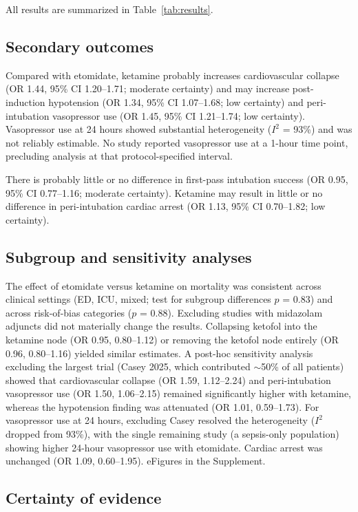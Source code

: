 \documentclass[11pt]{article}
\begin{document}
All results are summarized in Table~\ref{tab:results}.

\subsection{Secondary outcomes}

Compared with etomidate, ketamine probably increases cardiovascular collapse (OR 1.44, 95\% CI 1.20--1.71; moderate certainty) and may increase post-induction hypotension (OR 1.34, 95\% CI 1.07--1.68; low certainty) and peri-intubation vasopressor use (OR 1.45, 95\% CI 1.21--1.74; low certainty). Vasopressor use at 24 hours showed substantial heterogeneity ($I^2$ = 93\%) and was not reliably estimable. No study reported vasopressor use at a 1-hour time point, precluding analysis at that protocol-specified interval.

There is probably little or no difference in first-pass intubation success (OR 0.95, 95\% CI 0.77--1.16; moderate certainty). Ketamine may result in little or no difference in peri-intubation cardiac arrest (OR 1.13, 95\% CI 0.70--1.82; low certainty).

\subsection{Subgroup and sensitivity analyses}

The effect of etomidate versus ketamine on mortality was consistent across clinical settings (ED, ICU, mixed; test for subgroup differences $p$ = 0.83) and across risk-of-bias categories ($p$ = 0.88). Excluding studies with midazolam adjuncts did not materially change the results. Collapsing ketofol into the ketamine node (OR 0.95, 0.80--1.12) or removing the ketofol node entirely (OR 0.96, 0.80--1.16) yielded similar estimates. A post-hoc sensitivity analysis excluding the largest trial (Casey 2025, which contributed $\sim$50\% of all patients) showed that cardiovascular collapse (OR 1.59, 1.12--2.24) and peri-intubation vasopressor use (OR 1.50, 1.06--2.15) remained significantly higher with ketamine, whereas the hypotension finding was attenuated (OR 1.01, 0.59--1.73). For vasopressor use at 24 hours, excluding Casey resolved the heterogeneity ($I^2$ dropped from 93\%), with the single remaining study (a sepsis-only population) showing higher 24-hour vasopressor use with etomidate. Cardiac arrest was unchanged (OR 1.09, 0.60--1.95). eFigures in the Supplement.

\subsection{Certainty of evidence}
\end{document}
